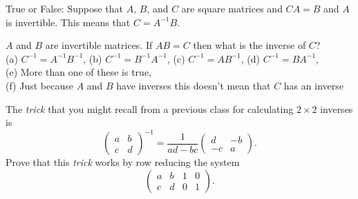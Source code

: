 %             


%     
%  
%             
% 

\begin{problem}
    True or False: Suppose that $A$, $B$, and $C$ are square matrices and $CA = B$ and $A$
    is invertible.  This means that $C = A^{-1} B$.
\end{problem}

%             
% 

\begin{problem}
    $A$ and $B$ are invertible matrices.  If $AB = C$ then what is the inverse of $C$? \\
    (a) $C^{-1} = A^{-1} B^{-1}$, \quad 
    (b) $C^{-1} = B^{-1} A^{-1}$, \quad 
    (c) $C^{-1} = A B^{-1}$, \quad 
    (d) $C^{-1} = B A^{-1}$, \quad \\
    (e) More than one of these is true, \quad \\ (f) Just because $A$ and $B$ have inverses
    this doesn't mean that $C$ has an inverse
\end{problem}

%             

\begin{problem}
The {\it trick} that you might recall from a previous class for calculating $2\times 2$ inverses is
\[ \begin{pmatrix} a & b \\ c & d \end{pmatrix}^{-1} = \frac{1}{ad-bc} \begin{pmatrix} d &
    -b \\ -c & a \end{pmatrix}. \]
Prove that this {\it trick} works by row reducing the system
\[ \left( \begin{array}{cc|cc} a & b & 1 & 0 \\ c & d & 0 & 1 \end{array} \right). \]
\end{problem}


